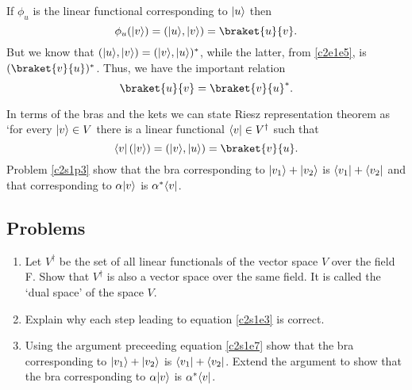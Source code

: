 If $\phi_u$ is the linear functional corresponding to $\lvert u\rangle$ then
\[
\phi_u(\ket{v}) = (\ket{u}, \ket{v}) = \braket{u}{v}.
\]
But we know that $(\lvert u\rangle, \lvert v\rangle) = (\lvert v\rangle, \lvert u\rangle)^\ast$, while the 
latter, from \eqref{c2e1e5}, is $(\braket{v}{u})^\ast$. Thus, we have the 
important relation
\begin{equation}\label{c2e1e6}
\braket{u}{v} = \braket{v}{u}^\ast.
\end{equation}

In terms of the bras and the kets we can state Riesz representation theorem
as `for every $\lvert v\rangle\in V$ there is a linear functional $\langle v\rvert \in 
V^\dagger$ such that
\begin{equation}\label{c2s1e7}
\bra{v}\left(\ket{v}\right) = (\ket{v}, \ket{u}) = \braket{v}{u}.
\end{equation}
Problem \ref{c2s1p3} show that the bra corresponding to $\lvert v_1\rangle + \lvert v_2\rangle$
is $\langle v_1\rvert + \langle v_2\rvert$ and that corresponding to $\alpha\lvert v\rangle$ is 
$\alpha^\ast\langle v\rvert$.


\subsection{Problems}
\begin{enumerate}
\item\label{c2s1p1} Let $V^\dagger$ be the set of all linear functionals of the 
vector space $V$ over the field F. Show that $V^\dagger$ is also a vector space 
over the same field. It is called the `dual space' of the space $V$.
\item Explain why each step leading to equation \eqref{c2s1e3} is correct.  
\item\label{c2s1p3} Using the argument preceeding equation \eqref{c2s1e7} show that the bra
corresponding to $\lvert v_1\rangle + \lvert v_2\rangle$ is $\langle v_1\rvert + \langle v_2\rvert$. Extend the
argument to show that the bra corresponding to $\alpha\lvert v\rangle$ is $\alpha^\ast
\langle v\rvert$.
\end{enumerate}